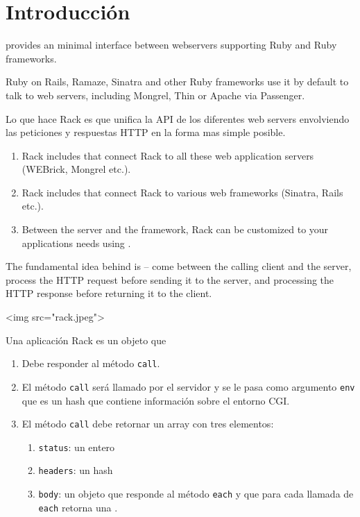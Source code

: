 \section{Introducción}

\rack{} provides an minimal interface between webservers supporting Ruby and Ruby frameworks.

Ruby on Rails, Ramaze, Sinatra and other Ruby frameworks use it by 
default to talk to web servers, including Mongrel, Thin or Apache via Passenger.

Lo que hace Rack es que unifica la API de los diferentes web servers
envolviendo las peticiones y respuestas HTTP en la forma mas simple posible.

\begin{enumerate}
\item 
Rack includes  that connect Rack to all these web application
servers (WEBrick, Mongrel etc.).

\item 
Rack includes  that connect Rack to various web frameworks (Sinatra, Rails etc.).

\item 
Between the server and the framework, Rack can be customized to your
applications needs using . 
\end{enumerate}

The fundamental idea behind 
 is – come between the calling client and the
server, process the HTTP request before sending it to the server, and
processing the HTTP response before returning it to the client.


\begin{rawhtml}
<img src="rack.jpeg">
\end{rawhtml}

Una aplicación Rack es un objeto que 

\begin{enumerate}
\item 
Debe responder al método \verb|call|.
\item 
El método \verb|call| será llamado por el servidor y se le pasa como
argumento \verb|env| que es un hash que contiene información sobre el entorno CGI.
\item 
El método \verb|call| debe retornar un array con tres elementos:
  \begin{enumerate}
  \item  \verb|status|: un entero
  \item  \verb|headers|: un hash
  \item \verb|body|: un objeto que responde al método \verb|each| y que para cada llamada de
  \verb|each| retorna una \String{}.
  \end{enumerate}
\end{enumerate}

